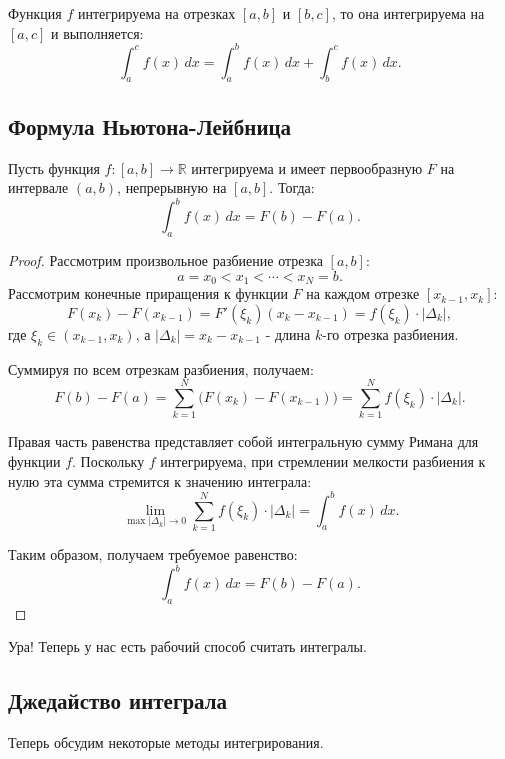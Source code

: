 \begin{theorem}\label{thm:additivity}
Функция $f$ интегрируема на отрезках $[a, b]$ и $[b, c]$, то она интегрируема на $[a, c]$ и выполняется:
\[
\int_a^c f(x) \, dx = \int_a^b f(x) \, dx + \int_b^c f(x) \, dx.
\]
\end{theorem}

\subsection{Формула Ньютона-Лейбница}

\begin{theorem}\label{thm:newton-leibniz}

Пусть функция $f \colon [a, b] \to \mathbb{R}$ интегрируема и имеет первообразную $F$ на интервале $(a, b)$, непрерывную на $[a, b]$. Тогда:
\[
\int_a^b f(x) \, dx = F(b) - F(a).
\]
\end{theorem}

\begin{proof}
Рассмотрим произвольное разбиение отрезка $[a, b]$:
\[
a = x_0 < x_1 < \cdots < x_N = b.
\]
Рассмотрим конечные приращения к функции $F$ на каждом отрезке $[x_{k-1}, x_k]$:
\[
F(x_k) - F(x_{k-1}) = F'(\xi_k)(x_k - x_{k-1}) = f(\xi_k) \cdot |\Delta_k|,
\]
где $\xi_k \in (x_{k-1}, x_k)$, а $|\Delta_k| = x_k - x_{k-1}$ - длина $k$-го отрезка разбиения.

Суммируя по всем отрезкам разбиения, получаем:
\[
F(b) - F(a) = \sum_{k=1}^N \big(F(x_k) - F(x_{k-1})\big) = \sum_{k=1}^N f(\xi_k) \cdot |\Delta_k|.
\]

Правая часть равенства представляет собой интегральную сумму Римана для функции $f$. Поскольку $f$ интегрируема, при стремлении мелкости разбиения к нулю эта сумма стремится к значению интеграла:
\[
\lim_{\max |\Delta_k| \to 0} \sum_{k=1}^N f(\xi_k) \cdot |\Delta_k| = \int_a^b f(x) \, dx.
\]

Таким образом, получаем требуемое равенство:
\[
\int_a^b f(x) \, dx = F(b) - F(a). 
\]
\end{proof}

Ура! Теперь у нас есть рабочий способ считать интегралы.

\subsection{Джедайство интеграла}

Теперь обсудим некоторые методы интегрирования.

